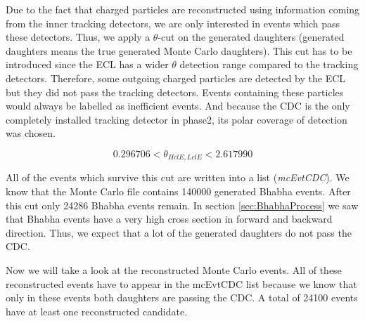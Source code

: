 \documentclass[a4paper,11pt,twosided,final,german,openbib,pdftex,listof=totoc,bibliography=totoc]{scrbook}
\begin{document}
Due to the fact that charged particles are reconstructed using information coming from the inner tracking detectors, we are only interested in events which pass these detectors. Thus, we apply a $\theta$-cut on the generated daughters (generated daughters means the true generated Monte Carlo daughters). This cut has to be introduced since the ECL has a wider $\theta$ detection range compared to the tracking detectors. Therefore, some outgoing charged particles are detected by the ECL but they did not pass the tracking detectors. Events containing these particles would always be labelled as inefficient events. And because the CDC is the only completely installed tracking detector in phase2, its polar coverage of detection was chosen.

\begin{equation}
	0.296706 < \theta_{HclE,LclE} < 2.617990
\end{equation}

All of the events which survive this cut are written into a list (\textit{mcEvtCDC}). We know that the Monte Carlo file contains 140000 generated Bhabha events. After this cut only 24286 Bhabha events remain.
In section \ref{sec:BhabhaProcess} we saw that Bhabha events have a very high cross section in forward and backward  direction. Thus, we expect that a lot of the generated daughters do not pass the CDC. 
\newline

Now we will take a look at the reconstructed Monte Carlo events. All of these reconstructed events have to appear in the mcEvtCDC list because we know that only in these events both daughters are passing the CDC. A total of 24100 events have at least one reconstructed candidate.
\end{document}
